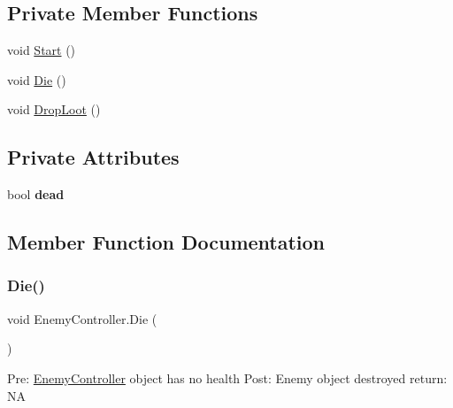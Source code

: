 \subsection*{Private Member Functions}
\begin{DoxyCompactItemize}
\item 
void \hyperlink{class_enemy_controller_aef5af22782327b22749e5632ad7467fb}{Start} ()
\item 
void \hyperlink{class_enemy_controller_aa2585b33cdd57288a0c5a669f188f6ca}{Die} ()
\item 
void \hyperlink{class_enemy_controller_a98b4f2b8c651189ef6b419e6400abc36}{Drop\+Loot} ()
\end{DoxyCompactItemize}
\subsection*{Private Attributes}
\begin{DoxyCompactItemize}
\item 
\mbox{\label{class_enemy_controller_a2428b11f3cec6e784f7982b60fcc0147}} 
bool {\bfseries dead}
\end{DoxyCompactItemize}


\subsection{Member Function Documentation}
\mbox{\label{class_enemy_controller_aa2585b33cdd57288a0c5a669f188f6ca}} 
\subsubsection{\texorpdfstring{Die()}{Die()}}
{\footnotesize\ttfamily void Enemy\+Controller.\+Die (\begin{DoxyParamCaption}{ }\end{DoxyParamCaption})\hspace{0.3cm}{\ttfamily [private]}}

Pre\+: \hyperlink{class_enemy_controller}{Enemy\+Controller} object has no health Post\+: Enemy object destroyed return\+: NA \mbox{\label{class_enemy_controller_a98b4f2b8c651189ef6b419e6400abc36}} 
